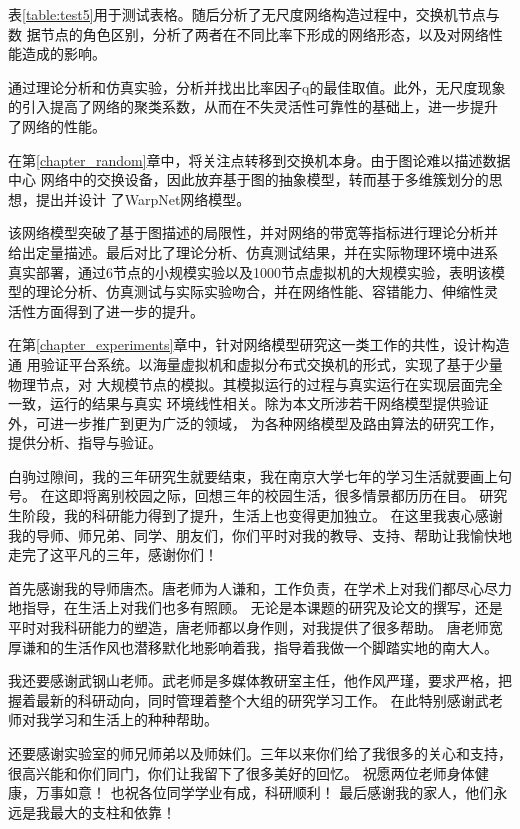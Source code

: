 \documentclass[master]{njuthesis}
\begin{document}
表\ref{table:test5}用于测试表格。随后分析了无尺度网络构造过程中，交换机节点与数
据节点的角色区别，分析了两者在不同比率下形成的网络形态，以及对网络性能造成的影响。

通过理论分析和仿真实验，分析并找出比率因子q的最佳取值。此外，无尺度现象
的引入提高了网络的聚类系数，从而在不失灵活性可靠性的基础上，进一步提升
了网络的性能。

在第\ref{chapter_random}章中，将关注点转移到交换机本身。由于图论难以描述数据中心
网络中的交换设备，因此放弃基于图的抽象模型，转而基于多维簇划分的思想，提出并设计
了WarpNet网络模型。

该网络模型突破了基于图描述的局限性，并对网络的带宽等指标进行理论分析并
给出定量描述。最后对比了理论分析、仿真测试结果，并在实际物理环境中进系
真实部署，通过6节点的小规模实验以及1000节点虚拟机的大规模实验，表明该模
型的理论分析、仿真测试与实际实验吻合，并在网络性能、容错能力、伸缩性灵
活性方面得到了进一步的提升。

在第\ref{chapter_experiments}章中，针对网络模型研究这一类工作的共性，设计构造通
用验证平台系统。以海量虚拟机和虚拟分布式交换机的形式，实现了基于少量物理节点，对
大规模节点的模拟。其模拟运行的过程与真实运行在实现层面完全一致，运行的结果与真实
环境线性相关。除为本文所涉若干网络模型提供验证外，可进一步推广到更为广泛的领域，
为各种网络模型及路由算法的研究工作，提供分析、指导与验证。

\begin{acknowledgement}
白驹过隙间，我的三年研究生就要结束，我在南京大学七年的学习生活就要画上句号。
在这即将离别校园之际，回想三年的校园生活，很多情景都历历在目。
研究生阶段，我的科研能力得到了提升，生活上也变得更加独立。
在这里我衷心感谢我的导师、师兄弟、同学、朋友们，你们平时对我的教导、支持、帮助让我愉快地走完了这平凡的三年，感谢你们！

首先感谢我的导师唐杰。唐老师为人谦和，工作负责，在学术上对我们都尽心尽力地指导，在生活上对我们也多有照顾。
无论是本课题的研究及论文的撰写，还是平时对我科研能力的塑造，唐老师都以身作则，对我提供了很多帮助。
唐老师宽厚谦和的生活作风也潜移默化地影响着我，指导着我做一个脚踏实地的南大人。

我还要感谢武钢山老师。武老师是多媒体教研室主任，他作风严瑾，要求严格，把握着最新的科研动向，同时管理着整个大组的研究学习工作。
在此特别感谢武老师对我学习和生活上的种种帮助。

还要感谢实验室的师兄师弟以及师妹们。三年以来你们给了我很多的关心和支持，很高兴能和你们同门，你们让我留下了很多美好的回忆。
祝愿两位老师身体健康，万事如意！ 也祝各位同学学业有成，科研顺利！
最后感谢我的家人，他们永远是我最大的支柱和依靠！

\end{acknowledgement}
\end{document}
